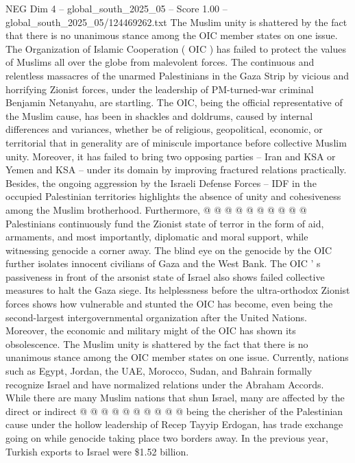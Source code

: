 \begin{textsample}{NEG Dim 4 – global\_south\_2025\_05 – Score 1.00 – global\_south\_2025\_05/124469262.txt}  \label{ex:f4_neg_369}
The Muslim unity is shattered by the fact that there is no unanimous stance among the OIC member states on one issue.
The Organization of Islamic Cooperation ( OIC ) has failed to protect the values of Muslims all over the globe from malevolent forces.
The continuous and relentless massacres of the unarmed Palestinians in the Gaza Strip by vicious and horrifying Zionist forces, under the leadership of PM-turned-war criminal Benjamin Netanyahu, are startling.
The OIC, being the official representative of the Muslim cause, has been in shackles and doldrums, caused by internal differences and variances, whether be of religious, geopolitical, economic, or territorial that in generality are of miniscule importance before collective Muslim unity.
Moreover, it has failed to bring two opposing parties -- Iran and KSA or Yemen and KSA -- under its domain by improving fractured relations practically.
Besides, the ongoing aggression by the Israeli Defense Forces -- IDF in the occupied Palestinian territories highlights the absence of unity and cohesiveness among the Muslim brotherhood.
Furthermore, @ @ @ @ @ @ @ @ @ @ Palestinians continuously fund the Zionist state of terror in the form of aid, armaments, and most importantly, diplomatic and moral support, while witnessing genocide a corner away.
The blind eye on the genocide by the OIC further isolates innocent civilians of Gaza and the West Bank.
The OIC ' s passiveness in front of the arsonist state of Israel also shows failed collective measures to halt the Gaza siege.
Its helplessness before the ultra-orthodox Zionist forces shows how vulnerable and stunted the OIC has become, even being the second-largest intergovernmental organization after the United Nations.
Moreover, the economic and military might of the OIC has shown its obsolescence.
The Muslim unity is shattered by the fact that there is no unanimous stance among the OIC member states on one issue.
Currently, nations such as Egypt, Jordan, the UAE, Morocco, Sudan, and Bahrain formally recognize Israel and have normalized relations under the Abraham Accords.
While there are many Muslim nations that shun Israel, many are affected by the direct or indirect @ @ @ @ @ @ @ @ @ @ being the cherisher of the Palestinian cause under the hollow leadership of Recep Tayyip Erdogan, has trade exchange going on while genocide taking place two borders away.
In the previous year, Turkish exports to Israel were \$1.52 billion.

\end{textsample}
